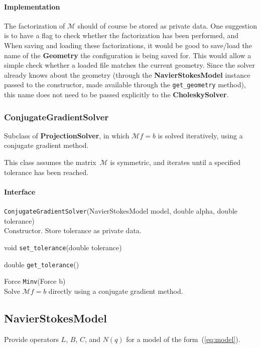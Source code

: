 \documentclass[11pt]{article}
\def\class#1{{\bf #1}} %
\def\fn#1{{\tt #1}} %
\begin{document}
\paragraph{Implementation}
The factorization of $\mathcal{M}$ should of course be stored as private data.  One suggestion is to have a flag to check whether the factorization has been performed, and When saving and loading these factorizations, it would be good to save/load the name of the \class{Geometry} the configuration is being saved for.  This would allow a simple check whether a loaded file matches the current geometry.  Since the solver already knows about the geometry (through the \class{NavierStokesModel} instance passed to the constructor, made available through the \fn{get\_geometry} method), this name does not need to be passed explicitly to the \class{CholeskySolver}.

\subsubsection{ConjugateGradientSolver}
Subclass of \class{ProjectionSolver}, in which $\mathcal{M}f=b$ is solved iteratively, using a conjugate gradient method.

This class assumes the matrix~$\mathcal{M}$ is symmetric, and iterates until a specified tolerance has been reached.

\paragraph{Interface}
\begin{description}
	\item \fn{ConjugateGradientSolver}(NavierStokesModel model, double alpha, double tolerance)\\
		Constructor.  Store tolerance as private data.
	\item void \fn{set\_tolerance}(double tolerance)
	\item double \fn{get\_tolerance}()
	\item Force \fn{Minv}(Force b)\\
		Solve $\mathcal{M}f = b$ directly using a conjugate gradient method.
\end{description}


\subsection{NavierStokesModel}
Provide operators $L$, $B$, $C$, and $N(q)$ for a model of the form~(\ref{eq:model}).
\end{document}
